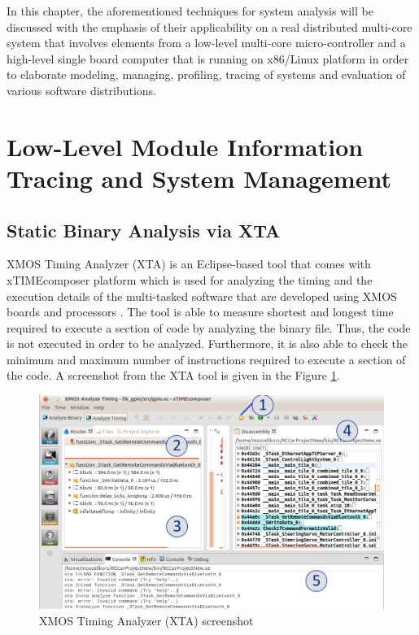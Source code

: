 In this chapter, the aforementioned techniques for system analysis will be discussed with the emphasis of their applicability on a real distributed multi-core system that involves elements from a low-level multi-core micro-controller and a high-level single board computer that is running on x86/Linux platform in order to elaborate  modeling, managing, profiling, tracing of systems and evaluation of various software distributions.

\section{Low-Level Module Information Tracing and System Management}
\subsection{Static Binary Analysis via XTA}
XMOS Timing Analyzer (XTA) \cite{xtamanual} is an Eclipse-based tool that comes with xTIMEcomposer platform which is used for analyzing the timing and the execution details of the multi-tasked software that are developed using XMOS boards and processors \cite{xtamanual}. The tool is able to measure shortest and longest time required to execute a section of code by analyzing the binary file. Thus, the code is not executed in order to be analyzed. Furthermore, it is also able to check the minimum and maximum number of instructions required to execute a section of the code.  A screenshot from the XTA tool is given in the Figure \ref{fig:xtass}.

\begin{figure}[!ht]
	\centering
	\captionsetup{justification=centering}
	\includegraphics[width=\textwidth]{content/images/xtass.png}
	\caption{XMOS Timing Analyzer (XTA) screenshot}
	\label{fig:xtass}
\end{figure}

